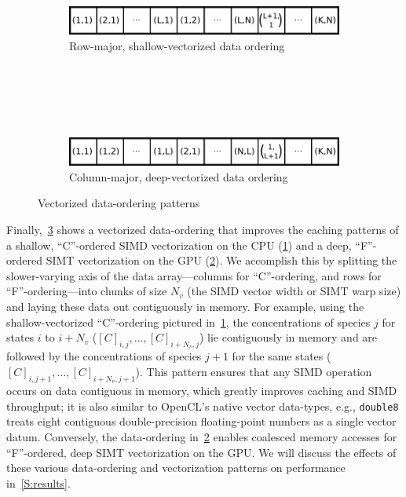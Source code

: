 \documentclass[12pt,number,sort&compress,preprint]{elsarticle}
\begin{document}
\begin{figure}[htb]
  \centering
  \begin{minipage}{0.6\linewidth}
    \begin{subfigure}[t]{\textwidth}
	\includegraphics[width=\textwidth]{row_major_split.pdf}
	\caption{Row-major, shallow-vectorized data ordering}
	\label{F:row_major_split}
    \end{subfigure}
    \\
    \\
    \\
    \\
    \begin{subfigure}[t]{\textwidth}
	\includegraphics[width=\textwidth]{column_major_split.pdf}
	\caption{Column-major, deep-vectorized data ordering}
	\label{F:column_major_split}
    \end{subfigure}
  \end{minipage}
  \caption{Vectorized data-ordering patterns}
  \label{F:vector_data}
\end{figure}

Finally,~\cref{F:vector_data} shows a vectorized data-ordering that improves the caching patterns of a shallow, ``C''-ordered SIMD vectorization on the CPU (\cref{F:row_major_split}) and a deep, ``F''-ordered SIMT vectorization on the GPU (\cref{F:column_major_split}).
We accomplish this by splitting the slower-varying axis of the data array---columns for ``C''-ordering, and rows for ``F''-ordering---into chunks of size $N_v$ (the SIMD vector width or SIMT warp size) and laying these data out contiguously in memory.
For example, using the shallow-vectorized ``C''-ordering pictured in~\cref{F:row_major_split}, the concentrations of species $j$ for states $i$ to $i+N_v$ ($[C]_{i, j}, \ldots, [C]_{i + N_v, j}$) lie contiguously in memory and are followed by the concentrations of species $j + 1$ for the same states ($[C]_{i, j + 1}, \ldots, [C]_{i + N_v, j + 1}$).
This pattern ensures that any SIMD operation occurs on data contiguous in memory, which greatly improves caching and SIMD throughput;
it is also similar to OpenCL's native vector data-types, e.g., \texttt{double\num{8}} treats eight contiguous double-precision floating-point numbers as a single vector datum.
Conversely, the data-ordering in~\cref{F:column_major_split} enables coalesced memory accesses for ``F''-ordered, deep SIMT vectorization on the GPU.
We will discuss the effects of these various data-ordering and vectorization patterns on performance in~\cref{S:results}.
\end{document}
